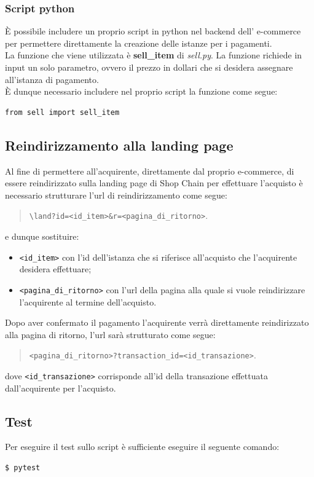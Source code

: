 \documentclass[a4paper, 12pt]{article}
\begin{document}
\subsubsection{Script python}
È possibile includere un proprio script in python nel backend dell' e-commerce per permettere direttamente la creazione delle istanze per i pagamenti.\\
La funzione che viene utilizzata è \textbf{sell\_item} di \textit{sell.py}. La funzione richiede in input un solo parametro, ovvero il prezzo in dollari che si desidera assegnare all'istanza di pagamento.\\
È dunque necessario includere nel proprio script la funzione come segue:
\begin{verbatim}
from sell import sell_item
\end{verbatim}
\subsection{Reindirizzamento alla landing page}
Al fine di permettere all'acquirente, direttamente dal proprio e-commerce, di essere reindirizzato sulla landing page di Shop Chain per effettuare l'acquisto è necessario strutturare l'url di reindirizzamento come segue:
\begin{quote}
  \verb|\land?id=<id_item>&r=<pagina_di_ritorno>|.
\end{quote}
e dunque sostituire:
\begin{itemize}
  \item \verb|<id_item>| con l'id dell'istanza che si riferisce all'acquisto che l'acquirente desidera effettuare;
  \item \verb|<pagina_di_ritorno>| con l'url della pagina alla quale si vuole reindirizzare l'acquirente al termine dell'acquisto.
\end{itemize}
Dopo aver confermato il pagamento l'acquirente verrà direttamente reindirizzato alla pagina di ritorno, l'url sarà strutturato come segue:
\begin{quote}
  \verb|<pagina_di_ritorno>?transaction_id=<id_transazione>|.
\end{quote}
dove \verb|<id_transazione>| corrisponde all'id della transazione effettuata dall'acquirente per l'acquisto.

\subsection{Test}
Per eseguire il test sullo script è sufficiente eseguire il seguente comando:
\begin{lstlisting}[language=bash]
$ pytest
\end{lstlisting}
\end{document}
